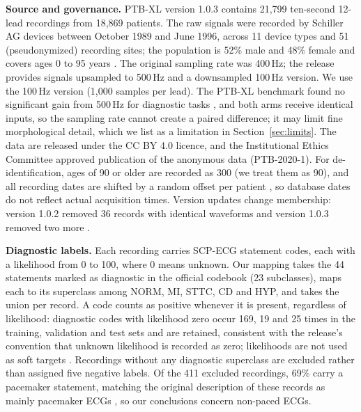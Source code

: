 \textbf{Source and governance.} PTB-XL version 1.0.3 contains 21,799 ten-second 12-lead recordings from 18,869 patients. The raw signals were recorded by Schiller AG devices between October 1989 and June 1996, across 11 device types and 51 (pseudonymized) recording sites; the population is 52\% male and 48\% female and covers ages 0 to 95 years \citep{wagner2020ptbxl}. The original sampling rate was 400\,Hz; the release provides signals upsampled to 500\,Hz and a downsampled 100\,Hz version. We use the 100\,Hz version (1,000 samples per lead). The PTB-XL benchmark found no significant gain from 500\,Hz for diagnostic tasks \citep{strodthoff2021benchmark}, and both arms receive identical inputs, so the sampling rate cannot create a paired difference; it may limit fine morphological detail, which we list as a limitation in Section~\ref{sec:limits}. The data are released under the CC BY 4.0 licence, and the Institutional Ethics Committee approved publication of the anonymous data (PTB-2020-1). For de-identification, ages of 90 or older are recorded as 300 (we treat them as 90), and all recording dates are shifted by a random offset per patient \citep{wagner2020ptbxl}, so database dates do not reflect actual acquisition times. Version updates change membership: version 1.0.2 removed 36 records with identical waveforms and version 1.0.3 removed two more \citep{wagner2022ptbxl103}.

\textbf{Diagnostic labels.} Each recording carries SCP-ECG statement codes, each with a likelihood from 0 to 100, where 0 means unknown. Our mapping takes the 44 statements marked as diagnostic in the official codebook (23 subclasses), maps each to its superclass among NORM, MI, STTC, CD and HYP, and takes the union per record. A code counts as positive whenever it is present, regardless of likelihood: diagnostic codes with likelihood zero occur 169, 19 and 25 times in the training, validation and test sets and are retained, consistent with the release's convention that unknown likelihood is recorded as zero; likelihoods are not used as soft targets \citep{wagner2022ptbxl103}. Recordings without any diagnostic superclass are excluded rather than assigned five negative labels. Of the 411 excluded recordings, 69\% carry a pacemaker statement, matching the original description of these records as mainly pacemaker ECGs \citep{wagner2020ptbxl}, so our conclusions concern non-paced ECGs.

